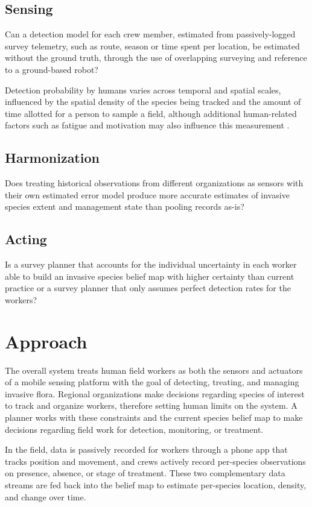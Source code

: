 \documentclass{article}
\begin{document}
\subsection{Sensing}
Can a detection model for each crew member, estimated from passively-logged survey telemetry, such as route, season or time spent per location, be estimated without the ground truth, through the use of overlapping surveying and reference to a ground-based robot?

Detection probability by humans varies across temporal and spatial scales, influenced by the spatial density of the species being tracked and the amount of time allotted for a person to sample a field, although additional human-related factors such as fatigue and motivation may also influence this measurement \cite{plants-stand-still-but-hide}.

\subsection{Harmonization}
Does treating historical observations from different organizations as sensors with their own estimated error model produce more accurate estimates of invasive species extent and management state than pooling records as-is?

\subsection{Acting}
Is a survey planner that accounts for the individual uncertainty in each worker able to build an invasive species belief map with higher certainty than current practice or a survey planner that only assumes perfect detection rates for the workers?


\section{Approach}
The overall system treats human field workers as both the sensors and actuators of a mobile sensing platform with the goal of detecting, treating, and managing invasive flora. Regional organizations make decisions regarding species of interest to track and organize workers, therefore setting human limits on the system. A planner works with these constraints and the current species belief map to make decisions regarding field work for detection, monitoring, or treatment.

In the field, data is passively recorded for workers through a phone app that tracks position and movement, and crews actively record per-species observations on presence, absence, or stage of treatment. These two complementary data streams are fed back into the belief map to estimate per-species location, density, and change over time. 
\end{document}
